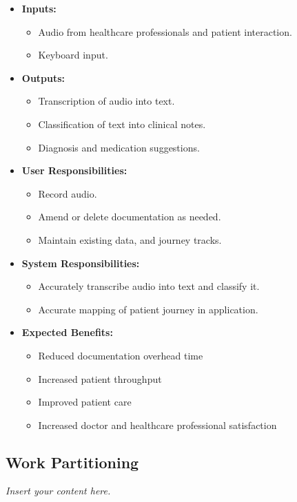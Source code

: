 \documentclass[12pt]{article}
\newcommand{\lips}{\textit{Insert your content here.}}
\begin{document}
\begin{itemize}
  \item \textbf{Inputs:}
  \begin{itemize}
    \item Audio from healthcare professionals and patient interaction.
    \item Keyboard input.
  \end{itemize}
  \item \textbf{Outputs:}
  \begin{itemize}
    \item Transcription of audio into text.
    \item Classification of text into clinical notes.
    \item Diagnosis and medication suggestions.
  \end{itemize}
  \item \textbf{User Responsibilities:}
  \begin{itemize}
    \item Record audio.
    \item Amend or delete documentation as needed.
    \item Maintain existing data, and journey tracks.
  \end{itemize}
  \item \textbf{System Responsibilities:}
  \begin{itemize}
    \item Accurately transcribe audio into text and classify it.
    \item Accurate mapping of patient journey in application.
  \end{itemize}

\item{\textbf{Expected Benefits:}}

\begin{itemize}
  \item Reduced documentation overhead time
  \item Increased patient throughput
  \item Improved patient care
  \item Increased doctor and healthcare professional satisfaction
\end{itemize}
\end{itemize}


\subsection{Work Partitioning}
\lips
\end{document}

